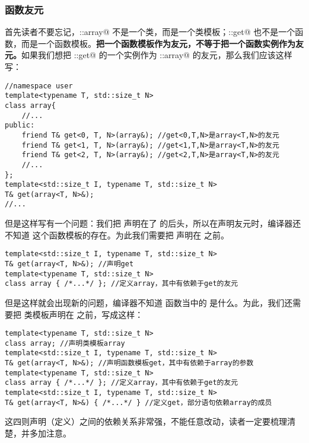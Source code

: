 \subsubsection*{函数友元}
首先读者不要忘记，\lstinline@user::array@ 不是一个类，而是一个类模板；\lstinline@user::get@ 也不是一个函数，而是一个函数模板。\textbf{把一个函数模板作为友元，不等于把一个函数实例作为友元。}如果我们想把 \lstinline@user::get@ 的一个实例作为 \lstinline@user::array@ 的友元，那么我们应该这样写：\pagebreak
\begin{lstlisting}
//namespace user
template<typename T, std::size_t N>
class array{
    //...
public:
    friend T& get<0, T, N>(array&); //get<0,T,N>是array<T,N>的友元
    friend T& get<1, T, N>(array&); //get<1,T,N>是array<T,N>的友元
    friend T& get<2, T, N>(array&); //get<2,T,N>是array<T,N>的友元
    //...
};
template<std::size_t I, typename T, std::size_t N>
T& get(array<T, N>&);
//...
\end{lstlisting}
但是这样写有一个问题：我们把 \lstinline@get@ 声明在了 \lstinline@array@ 的后头，所以在声明友元时，编译器还不知道 \lstinline@get@ 这个函数模板的存在。为此我们需要把 \lstinline@get@ 声明在 \lstinline@array@ 之前。
\begin{lstlisting}
template<std::size_t I, typename T, std::size_t N>
T& get(array<T, N>&); //声明get
template<typename T, std::size_t N>
class array { /*...*/ }; //定义array，其中有依赖于get的友元
\end{lstlisting}
但是这样就会出现新的问题，编译器不知道 \lstinline@get@ 函数当中的 \lstinline@array@ 是什么。为此，我们还需要把 \lstinline@array@ 类模板声明在 \lstinline@get@ 之前，写成这样：
\begin{lstlisting}
template<typename T, std::size_t N>
class array; //声明类模板array
template<std::size_t I, typename T, std::size_t N>
T& get(array<T, N>&); //声明函数模板get，其中有依赖于array的参数
template<typename T, std::size_t N>
class array { /*...*/ }; //定义array，其中有依赖于get的友元
template<std::size_t I, typename T, std::size_t N>
T& get(array<T, N>&) { /*...*/ } //定义get，部分语句依赖array的成员
\end{lstlisting}
这四则声明（定义）之间的依赖关系非常强，不能任意改动，读者一定要梳理清楚，并多加注意。\par
